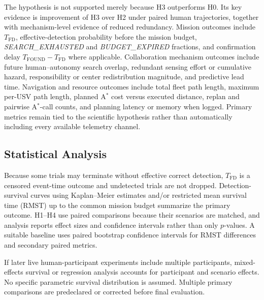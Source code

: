 \documentclass[letterpaper, 10pt, conference]{ieeeconf}
\begin{document}
The hypothesis is not supported merely because H3 outperforms H0. Its key evidence is improvement of H3 over H2 under paired human trajectories, together with mechanism-level evidence of reduced redundancy. Mission outcomes include \(T_{\mathrm{FD}}\), effective-detection probability before the mission budget, \emph{SEARCH\_EXHAUSTED} and \emph{BUDGET\_EXPIRED} fractions, and confirmation delay \(T_{\mathrm{FOUND}}-T_{\mathrm{FD}}\) where applicable. Collaboration mechanism outcomes include future human--autonomy search overlap, redundant sensing effort or cumulative hazard, responsibility or center redistribution magnitude, and predictive lead time. Navigation and resource outcomes include total fleet path length, maximum per-USV path length, planned A\(^\ast\) cost versus executed distance, replan and pairwise A\(^\ast\)-call counts, and planning latency or memory when logged. Primary metrics remain tied to the scientific hypothesis rather than automatically including every available telemetry channel.

\subsection{Statistical Analysis}

Because some trials may terminate without effective correct detection, \(T_{\mathrm{FD}}\) is a censored event-time outcome and undetected trials are not dropped. Detection-survival curves using Kaplan--Meier estimates and/or restricted mean survival time (RMST) up to the common mission budget summarize the primary outcome. H1--H4 use paired comparisons because their scenarios are matched, and analysis reports effect sizes and confidence intervals rather than only \(p\)-values. A suitable baseline uses paired bootstrap confidence intervals for RMST differences and secondary paired metrics.

If later live human-participant experiments include multiple participants, mixed-effects survival or regression analysis accounts for participant and scenario effects. No specific parametric survival distribution is assumed. Multiple primary comparisons are predeclared or corrected before final evaluation.
\end{document}
